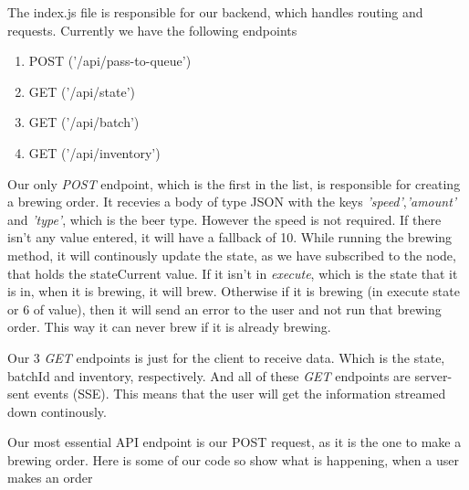 
The index.js file is responsible for our backend, which handles routing and requests. Currently we have the following endpoints
\begin{enumerate}
    \item {POST ('/api/pass-to-queue')}
    \item {GET ('/api/state')}
    \item {GET ('/api/batch')}
    \item {GET ('/api/inventory')}
\end{enumerate}

Our only \textit{POST} endpoint, which is the first in the list, is responsible for creating a brewing order. It recevies a body of type JSON with the keys \textit{'speed'},\textit{'amount'} and \textit{'type'}, which is the beer type. However the speed is not required. If there isn't any value entered, it will have a fallback of 10.
While running the brewing method, it will continously update the state, as we have subscribed to the node, that holds the stateCurrent value. If it isn't in \textit{execute}, which is the state that it is in, when it is brewing, it will brew. Otherwise if it is brewing (in execute state or 6 of value), then it will send an error to the user and not run that brewing order.
This way it can never brew if it is already brewing. \newline

Our 3 \textit{GET} endpoints is just for the client to receive data. Which is the state, batchId and inventory, respectively.
And all of these \textit{GET} endpoints are server-sent events (SSE). This means that the user will get the information streamed down continously. \newline

Our most essential API endpoint is our POST request, as it is the one to make a brewing order. Here is some of our code so show what is happening, when a user makes an order

